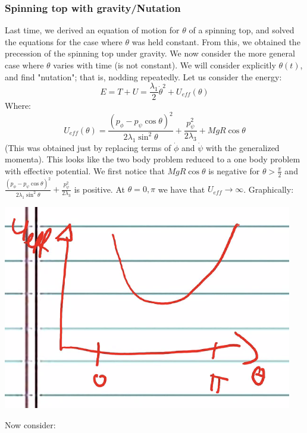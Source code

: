 \subsubsection{Spinning top with gravity/Nutation}
Last time, we derived an equation of motion for $\theta$ of a spinning top, and solved the equations for the case where $\theta$ was held constant. From this, we obtained the precession of the spinning top under gravity. We now consider the more general case where $\theta$ varies with time (is not constant). We will consider explicitly $\theta(t)$, and find "nutation"; that is, nodding repeatedly. Let us consider the energy:
\[E = T + U = \frac{\lambda_1}{2}\dot{\theta}^2 + U_{eff}(\theta)\]
Where:
\[U_{eff}(\theta) = \frac{(p_\phi - p_\psi\cos\theta)^2}{2\lambda_1\sin^2\theta} + \frac{p_\psi^2}{2\lambda_3} + MgR\cos\theta\]
(This was obtained just by replacing terms of $\dot{\phi}$ and $\dot{\psi}$ with the generalized momenta). This looks like the two body problem reduced to a one body problem with effective potential. We first notice that $MgR\cos\theta$ is negative for $\theta > \frac{\pi}{2}$ and $\frac{(p_\phi - p_\psi\cos\theta)^2}{2\lambda_1\sin^2\theta} + \frac{p_\psi^2}{2\lambda_3}$ is positive. At $\theta = 0, \pi$ we have that $U_{eff} \rightarrow \infty$. Graphically:
\begin{center}
    \includegraphics[scale=0.5]{Lecture-22/l22-img1.png}
\end{center}
Now consider:
